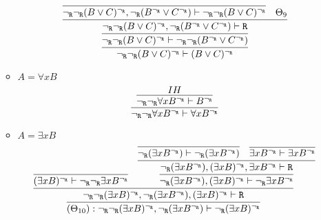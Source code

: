 \begin{enumerate}[(i)]
\begin{itemize}
            $$
                \infer{
                    \ngr\ngr(B \vee C)^\ngr \vdash (B \vee C)^\ngr
                }{
                    \infer{
                        \ngr\ngr(B \vee C)^\ngr \vdash \ngr\ngr(B^\ngr \vee C^\ngr)
                    }{
                        \infer{
                            \ngr\ngr(B \vee C)^\ngr, \ngr(B^\ngr \vee C^\ngr) \vdash \R
                        }{
                            \infer{
                                \ngr\ngr(B \vee C)^\ngr, \ngr(B^\ngr \vee C^\ngr) \vdash \ngr\ngr(B \vee C)^\ngr
                            }{
                            }&
                            \Theta_9
                        }
                    }
                }
            $$
        \item $A=\forall x B$
            $$
                \infer{
                    \ngr\ngr \forall x B^\ngr \vdash \forall x B^\ngr
                }{
                    \infer{
                       \ngr\ngr \forall x B^\ngr \vdash B^\ngr
                    }{
                        IH
                    }
                }
            $$
        \item $A=\exists x B$
            $$\infer{
                            (\Theta_{10}) : \ngr\ngr(\exists x B)^\ngr, \ngr(\exists x B^\ngr) \vdash \ngr(\exists x B)^\ngr
                        }{
                            \infer{
                                \ngr\ngr(\exists x B)^\ngr, \ngr(\exists x B^\ngr), (\exists x B)^\ngr \vdash \R
                            }{
                                \infer{
                                    (\exists x B)^\ngr \vdash \ngr\ngr\exists x B^\ngr
                                }{
                                }&
                                \infer{
                                    \ngr(\exists x B^\ngr), (\exists x B)^\ngr \vdash \ngr\exists x B^\ngr
                                }{
                                    \infer{
                                        \ngr(\exists x B^\ngr), (\exists x B)^\ngr, \exists x B^\ngr \vdash \R
                                    }{
                                        \infer{
                                            \ngr(\exists x B^\ngr) \vdash \ngr(\exists x B^\ngr)
                                        }{
                                        }&
                                        \infer{
                                            \exists x B^\ngr \vdash \exists x B^\ngr
                                        }{
                                        }
                                    }
                                }
                            }
                        }
            $$
        

\end{itemize}
\end{enumerate}
